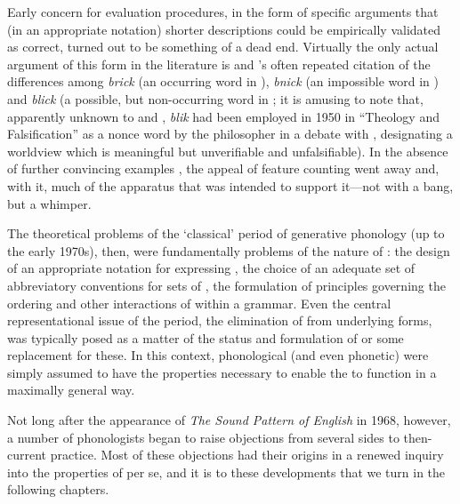 Early concern for evaluation procedures, in the form of specific
arguments that (in an appropriate notation) shorter descriptions could
be empirically validated as correct, turned out to be something of a
dead end. Virtually the only actual argument of this form in the
literature is {\Chomsky} and {\Halle}'s often repeated citation of the
differences among \emph{brick} (an occurring word in ),
\emph{bnick} (an impossible word in ) and \emph{blick} (a
possible, but non-occurring word in ; it is amusing to note
that, apparently unknown to {\Chomsky} and {\Halle}, \emph{blik} had been
employed in 1950 in ``Theology and Falsification'' as a nonce word by
the philosopher  in a debate with , designating a
worldview which is meaningful but unverifiable and unfalsifiable). In
the absence of further convincing examples \citep[but see][ch. 6 for
an attempt to construct another]{sra74:orgphon} , the appeal of
feature counting went away and, with it, much of the apparatus that
was intended to support it—not with a bang, but a whimper.

The theoretical problems of the `classical' period of generative
phonology (up to the early 1970s), then, were fundamentally problems
of the nature of : the design of an appropriate notation for
expressing , the choice of an adequate set of abbreviatory
conventions for sets of , the formulation of principles governing
the ordering and other interactions of  within a grammar. Even
the central representational issue of the period, the elimination of
 from underlying forms, was typically posed as a matter of
the status and formulation of  or some
replacement for these. In this context, phonological (and even
phonetic)  were simply assumed to have the properties
necessary to enable the  to function in a maximally general way.

Not long after the appearance of \textsl{The Sound Pattern of English}
in 1968, however, a number of phonologists began to raise objections
from several sides to then-current practice. Most of these objections
had their origins in a renewed inquiry into the properties of
 per se, and it is to these developments that we turn
in the following chapters.

